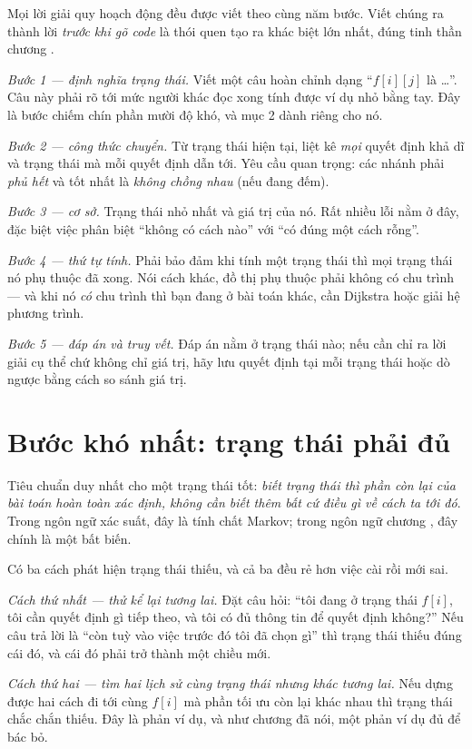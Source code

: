 \documentclass[../../algorithm.tex]{subfiles}
\begin{document}
Mọi lời giải quy hoạch động đều được viết theo cùng năm bước. Viết chúng ra thành lời \emph{trước khi gõ code} là thói quen tạo ra khác biệt lớn nhất, đúng tinh thần chương .

\emph{Bước 1 --- định nghĩa trạng thái.} Viết một câu hoàn chỉnh dạng ``\(f[i][j]\) là \dots{}''. Câu này phải rõ tới mức người khác đọc xong tính được ví dụ nhỏ bằng tay. Đây là bước chiếm chín phần mười độ khó, và mục 2 dành riêng cho nó.

\emph{Bước 2 --- công thức chuyển.} Từ trạng thái hiện tại, liệt kê \emph{mọi} quyết định khả dĩ và trạng thái mà mỗi quyết định dẫn tới. Yêu cầu quan trọng: các nhánh phải \emph{phủ hết} và tốt nhất là \emph{không chồng nhau} (nếu đang đếm).

\emph{Bước 3 --- cơ sở.} Trạng thái nhỏ nhất và giá trị của nó. Rất nhiều lỗi nằm ở đây, đặc biệt việc phân biệt ``không có cách nào'' với ``có đúng một cách rỗng''.

\emph{Bước 4 --- thứ tự tính.} Phải bảo đảm khi tính một trạng thái thì mọi trạng thái nó phụ thuộc đã xong. Nói cách khác, đồ thị phụ thuộc phải không có chu trình --- và khi nó \emph{có} chu trình thì bạn đang ở bài toán khác, cần Dijkstra hoặc giải hệ phương trình.

\emph{Bước 5 --- đáp án và truy vết.} Đáp án nằm ở trạng thái nào; nếu cần chỉ ra lời giải cụ thể chứ không chỉ giá trị, hãy lưu quyết định tại mỗi trạng thái hoặc dò ngược bằng cách so sánh giá trị.

\section{Bước khó nhất: trạng thái phải đủ}

Tiêu chuẩn duy nhất cho một trạng thái tốt: \emph{biết trạng thái thì phần còn lại của bài toán hoàn toàn xác định, không cần biết thêm bất cứ điều gì về cách ta tới đó}. Trong ngôn ngữ xác suất, đây là tính chất Markov; trong ngôn ngữ chương , đây chính là một bất biến.

Có ba cách phát hiện trạng thái thiếu, và cả ba đều rẻ hơn việc cài rồi mới sai.

\emph{Cách thứ nhất --- thử kể lại tương lai.} Đặt câu hỏi: ``tôi đang ở trạng thái \(f[i]\), tôi cần quyết định gì tiếp theo, và tôi có đủ thông tin để quyết định không?'' Nếu câu trả lời là ``còn tuỳ vào việc trước đó tôi đã chọn gì'' thì trạng thái thiếu đúng cái đó, và cái đó phải trở thành một chiều mới.

\emph{Cách thứ hai --- tìm hai lịch sử cùng trạng thái nhưng khác tương lai.} Nếu dựng được hai cách đi tới cùng \(f[i]\) mà phần tối ưu còn lại khác nhau thì trạng thái chắc chắn thiếu. Đây là phản ví dụ, và như chương  đã nói, một phản ví dụ đủ để bác bỏ.
\end{document}
